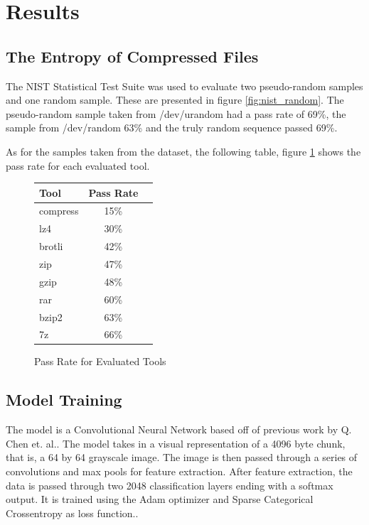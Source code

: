 \documentclass[conference]{IEEEtran}
\begin{document}

\section{Results}

\subsection{The Entropy of Compressed Files}

The NIST Statistical Test Suite was used to evaluate two pseudo-random samples and one random sample. These are presented in figure \ref{fig:nist_random}. The pseudo-random sample taken from /dev/urandom had a pass rate of 69\%, the sample from /dev/random 63\% and the truly random sequence passed 69\%.

As for the samples taken from the dataset, the following table, figure \ref{fig:nist_samples} shows the pass rate for each evaluated tool.

\begin{figure}[H]
    \centering
    \begin{tabular}{l|c|c}
        Tool & Pass Rate\\ \hline
        compress & 15\%\\
        lz4 & 30\%\\
        brotli & 42\%\\
        zip & 47\% \\
        gzip & 48\%\\
        rar & 60\%\\
        bzip2 & 63\%\\
        7z & 66\%\\
    \end{tabular}
    \caption{Pass Rate for Evaluated Tools}
    \label{fig:nist_samples}
\end{figure}

\subsection{Model Training}
\label{result:model}

The model is a Convolutional Neural Network based off of previous work by Q. Chen et. al.. The model takes in a visual representation of a 4096 byte chunk, that is, a 64 by 64 grayscale image. The image is then passed through a series of convolutions and max pools for feature extraction. After feature extraction, the data is passed through two 2048 classification layers ending with a softmax output. It is trained using the Adam optimizer and Sparse Categorical Crossentropy as loss function.\cite{chen2018}.
\end{document}
